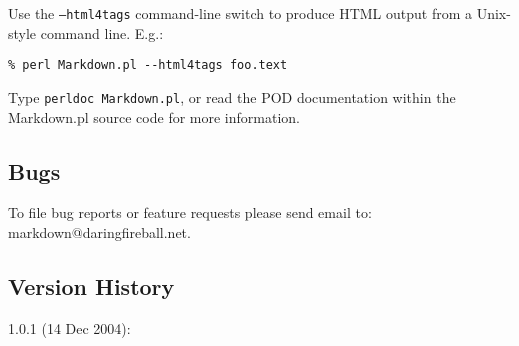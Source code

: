 Use the \texttt{--html4tags} command-line switch to produce HTML output from a
Unix-style command line. E.g.:

\begin{lstlisting}
% perl Markdown.pl --html4tags foo.text
\end{lstlisting}




Type \texttt{perldoc Markdown.pl}, or read the POD documentation within the
Markdown.pl source code for more information.

\subsection*{Bugs}




To file bug reports or feature requests please send email to:
markdown@daringfireball.net.

\subsection*{Version History}




1.0.1 (14 Dec 2004):

